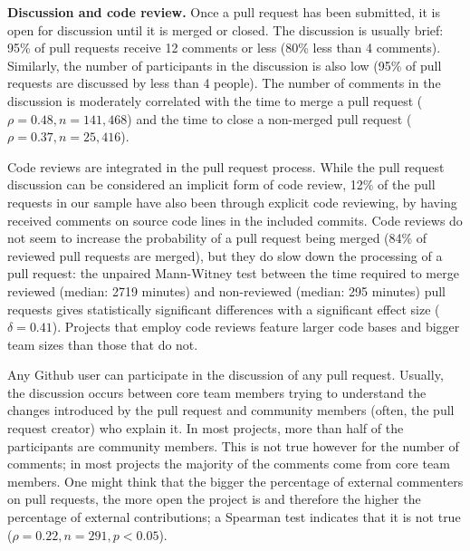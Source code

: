 \documentclass{sig-alternate}
\begin{document}
\textbf{Discussion and code review.}
Once a pull request has been submitted, it is open for discussion until it is
merged or closed. The discussion is usually brief: 95\% of pull requests receive
12 comments or less (80\% less than 4 comments).
Similarly, the number of participants in the discussion is also low (95\% of
pull requests are discussed by less than 4 people).
The number of
comments in the discussion is moderately correlated with the time to merge a
pull request ($\rho = 0.48, n = 141,468$) and the time to close a non-merged
pull request ($\rho = 0.37, n = 25,416$). 

Code reviews are integrated in the pull request process. While the pull request
discussion can be considered an implicit form of code review, 12\% of the pull
requests in our sample have also been through explicit code reviewing, by having
received comments on source code lines in the included commits. Code reviews do
not seem to increase the probability of a pull request being merged (84\% of
reviewed pull requests are merged), but they do slow down the processing of a
pull request: the unpaired Mann-Witney test between the time required to merge
reviewed (median: 2719 minutes) and non-reviewed (median: 295 minutes) pull
requests gives statistically significant differences with a significant effect
size ($\delta = 0.41$). Projects that employ code reviews feature larger code
bases and bigger team sizes than those that do not.

Any Github user can participate in the discussion of any pull request. Usually,
the discussion occurs between core team members trying to understand the changes
introduced by the pull request and community members (often, the pull request
creator) who explain it.
In most projects, more than half of the participants are
community members. This is not true however for the number of comments; in most
projects the majority of the comments come from core team members. One might
think that the bigger the percentage of external commenters on pull requests,
the more open the project is and therefore the higher the percentage of
external contributions; a Spearman test indicates that it is not true ($\rho =
0.22, n = 291, p < 0.05$).

\noindent
{}
\end{document}
